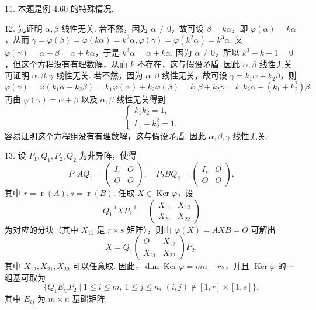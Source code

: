 \documentclass[UTF8,12pt,a4paper,fontset=fandol]{ctexart}
\begin{document}
11. 本题是例 4.60 的特殊情况.

12. 先证明 $\alpha,\beta$ 线性无关. 若不然，因为 $\alpha\ne0$，故可设 $\beta=k\alpha$，即 $\varphi(\alpha)=k\alpha$，从而 $\gamma=\varphi(\beta)=\varphi(k\alpha)=k^2\alpha,\varphi(\gamma)=\varphi(k^2\alpha)=k^3\alpha$. 又 $\varphi(\gamma)=\alpha+\beta=\alpha+k\alpha$，于是 $k^3\alpha=\alpha+k\alpha$. 因为 $\alpha\ne0$，所以 $k^3-k-1=0$，但这个方程没有有理数解，从而 $k$ 不存在，这与假设矛盾. 因此 $\alpha,\beta$ 线性无关. 再证明 $\alpha,\beta,\gamma$ 线性无关. 若不然，因为 $\alpha,\beta$ 线性无关，故可设 $\gamma=k_1\alpha+k_2\beta$，则
\[
\varphi(\gamma)=\varphi(k_1\alpha+k_2\beta)=k_1\varphi(\alpha)+k_2\varphi(\beta)=k_1\beta+k_2\gamma
=k_1k_2\alpha+(k_1+k_2^2)\beta.
\]
再由 $\varphi(\gamma)=\alpha+\beta$ 以及 $\alpha,\beta$ 线性无关得到
\[
\left\{
\begin{array}{l}
k_1k_2=1,\\
k_1+k_2^2=1.
\end{array}
\right.
\]
容易证明这个方程组没有有理数解，这与假设矛盾. 因此 $\alpha,\beta,\gamma$ 线性无关.

13. 设 $P_1,Q_1,P_2,Q_2$ 为非异阵，使得
\[
P_1AQ_1=\left(\begin{array}{cc}I_r&O\\O&O\end{array}\right),\quad
P_2BQ_2=\left(\begin{array}{cc}I_s&O\\O&O\end{array}\right),
\]
其中 $r=\operatorname{r}(A),s=\operatorname{r}(B)$. 任取 $X\in\operatorname{Ker}\varphi$，设
\[
Q_1^{-1}XP_2^{-1}=\left(\begin{array}{cc}X_{11}&X_{12}\\X_{21}&X_{22}\end{array}\right)
\]
为对应的分块（其中 $X_{11}$ 是 $r\times s$ 矩阵），则由 $\varphi(X)=AXB=O$ 可解出
\[
X=Q_1\left(\begin{array}{cc}O&X_{12}\\X_{21}&X_{22}\end{array}\right)P_2,
\]
其中 $X_{12},X_{21},X_{22}$ 可以任意取. 因此，$\dim\operatorname{Ker}\varphi=mn-rs$，并且 $\operatorname{Ker}\varphi$ 的一组基可取为
\[
\{Q_1E_{ij}P_2\mid 1\le i\le m,\ 1\le j\le n,\ (i,j)\notin[1,r]\times[1,s]\},
\]
其中 $E_{ij}$ 为 $m\times n$ 基础矩阵.
\end{document}

